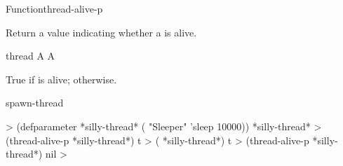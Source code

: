 \documentclass[10pt,twoside,english,pdftex]{article}
\begin{document}
\begin{functiondoc}{Function}{thread-alive-p}{ 
    }

\fnsyntax

\fnpurpose Return a value indicating whether a  is alive.

\fnpackage {}

\fnmodule {}

\fnargs
\begin{args}{thread}
\arg[thread] A 
\arg[boolean] A 
\end{args}

\fnreturns True if  is alive; \nil{} otherwise.

\fnerrors
\nothreads{}

\begin{alsos}{spawn-thread}
\end{alsos}

%
%
\fnexamples
%
\W\supp
\begin{example}
  > (defparameter *silly-thread* ( "Sleeper" 'sleep 10000))
  *silly-thread*
  > (thread-alive-p *silly-thread*)
  t
  > ( *silly-thread*)
  t
  > (thread-alive-p *silly-thread*)
  nil
  >
\end{example}

\end{functiondoc}

\end{document}
